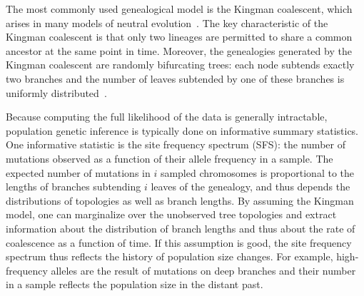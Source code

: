 \documentclass[11pt, letterpaper]{article}   	%
\begin{document}
The most commonly used genealogical model is the Kingman coalescent, which arises in many models of neutral evolution~\autocite{Kingman1982, Hudson1983, Tajima1983}.
The key characteristic of the Kingman coalescent is that only two lineages are permitted to share a common ancestor at the same point in time.
Moreover, the genealogies generated by the Kingman coalescent are randomly bifurcating trees: each node subtends exactly two branches and the number of leaves subtended by one of these branches is uniformly distributed~\autocite{Tajima1983}.



Because computing the full likelihood of the data is generally intractable, population genetic inference is typically done on informative summary statistics.
One informative statistic is the site frequency spectrum (SFS): the number of mutations observed as a function of their allele frequency in a sample.
The expected number of mutations in $i$ sampled chromosomes is proportional to the lengths of branches subtending $i$ leaves of the genealogy, and thus depends the distributions of topologies as well as branch lengths.
By assuming the Kingman model, one can marginalize over the unobserved tree topologies and extract information about the distribution of branch lengths and thus about the rate of coalescence as a function of time.
If this assumption is good, the site frequency spectrum thus reflects the history of population size changes.
For example, high-frequency alleles are the result of mutations on deep branches and their number in a sample reflects the population size in the distant past.
\end{document}
